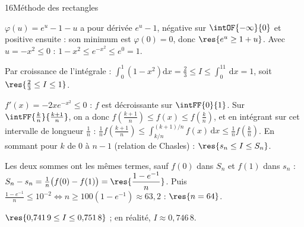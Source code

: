 \begin{corrige}{16}{Méthode des rectangles}
\begin{questions}
  \item $\varphi(u)=e^{u}-1-u$ a pour dérivée $e^{u}-1$, négative sur $\intOF{-\infty}{0}$ et positive ensuite : son minimum est
    $\varphi(0)=0$, donc $\res{e^{u}\geq1+u}$. Avec $u=-x^{2}\leq0$ : $1-x^{2}\leq e^{-x^{2}}\leq e^{0}=1$.
  \item Par croissance de l'intégrale : $\int_0^1\left(1-x^{2}\right)\mathrm{d}x=\frac23\leq I\leq\int_0^11\,\mathrm{d}x=1$, soit $\res{\frac23\leq I\leq1}$.
\end{questions}
\begin{questions}[resume]
  \item $f'(x)=-2xe^{-x^{2}}\leq0$ : $f$ est décroissante sur $\intFF{0}{1}$. Sur $\intFF{\frac kn}{\frac{k+1}{n}}$, on a donc
    $f\left(\frac{k+1}{n}\right)\leq f(x)\leq f\left(\frac kn\right)$, et en intégrant sur cet intervalle de longueur $\frac1n$ :
    $\frac1nf\left(\frac{k+1}{n}\right)\leq\int_{k/n}^{(k+1)/n}f(x)\,\mathrm{d}x\leq\frac1nf\left(\frac kn\right)$. En sommant pour $k$ de $0$
    à $n-1$ (relation de Chasles) : $\res{s_n\leq I\leq S_n}$.
  \item Les deux sommes ont les mêmes termes, sauf $f(0)$ dans $S_n$ et $f(1)$ dans $s_n$ :
    $S_n-s_n=\frac1n\big(f(0)-f(1)\big)=\res{\dfrac{1-e^{-1}}{n}}$. Puis $\frac{1-e^{-1}}{n}\leq10^{-2}\iff n\geq100\left(1-e^{-1}\right)\approx63{,}2$ :
    $\res{n=64}$.
  \item $\res{0{,}741\,9\leq I\leq0{,}751\,8}$ ; en réalité, $I\approx0{,}746\,8$.
\end{questions}
\end{corrige}


